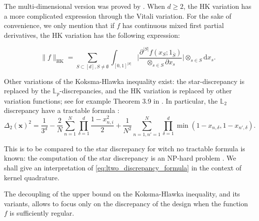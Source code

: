 \documentclass[twoside,11pt]{book}
\newtheorem{theorem}{Theorem}
\begin{document}
The multi-dimensional version was proved by \cite{Hla61}. When $d \geq 2$, the HK variation has a more complicated expression through the Vitali variation. For the sake of convenience, we only mention that if $f$ has continuous mixed first partial derivatives, the HK variation has the following expression:

\begin{equation}
\|f\|_{\mathrm{HK}} = \sum\limits_{S \subset[d], S \neq \emptyset} \int_{[0,1]^{|S|}} \bigg|\frac{\partial^{|S|} f (x_S;1_{\bar{S}})}{\otimes_{s \in S}\partial x_{s}} \bigg| \otimes_{s \in S}\mathrm{d} x_{s}.
\end{equation}

Other variations of the Koksma-Hlawka inequality exist: the star-discrepancy is replaced by the $\mathbb{L}_{p}$-discrepancies, and the HK variation is replaced by other variation functions; see for example Theorem 3.9 in \citep{DiPi14}. In particular, the $\mathbb{L}_{2}$ discrepancy have a tractable formula \citep{War72}:
\begin{equation}\label{eq:ltwo_discrepancy_formula}
\Delta_{2}(\bm{x})^{2} = \frac{1}{3^{d}} - \frac{2}{N} \sum\limits_{n = 1}^{N} \prod\limits_{\delta=1}^{d} \frac{1-x_{n,i}^{2}}{2} + \frac{1}{N^2} \sum\limits_{n=1,n'=1}^{N} \prod\limits_{\delta=1}^{d} \min(1-x_{n,\delta},1-x_{n',\delta}).
\end{equation}

This is to be compared to the star discrepancy for witch no tractable formula is known: the computation of the star discrepancy is an NP-hard problem \citep{GnSrWi09}. We shall give an interpretation of \eqref{eq:ltwo_discrepancy_formula} in the context of kernel quadrature.

The decoupling of the upper bound on the Koksma-Hlawka inequality, and its variants, allows to focus only on the discrepancy of the design when the function $f$ is sufficiently regular.




\end{document}
